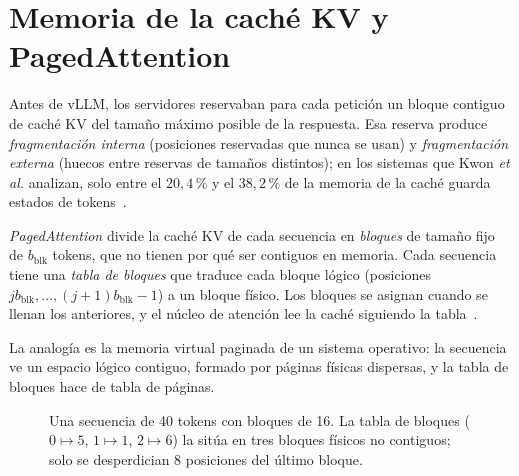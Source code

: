 \section{Memoria de la caché KV y PagedAttention}

Antes de vLLM, los servidores reservaban para cada petición un bloque contiguo de caché KV del tamaño máximo posible de la respuesta. Esa reserva produce \emph{fragmentación interna} (posiciones reservadas que nunca se usan) y \emph{fragmentación externa} (huecos entre reservas de tamaños distintos); en los sistemas que Kwon \emph{et al.} analizan, solo entre el $20{,}4\,\%$ y el $38{,}2\,\%$ de la memoria de la caché guarda estados de tokens~\cite[§1 y §3.1]{kwon}.

\begin{definicion}[PagedAttention]\label{def:paged}
\emph{PagedAttention} divide la caché KV de cada secuencia en \emph{bloques} de tamaño fijo de $b_{\mathrm{blk}}$ tokens, que no tienen por qué ser contiguos en memoria. Cada secuencia tiene una \emph{tabla de bloques} que traduce cada bloque lógico (posiciones $jb_{\mathrm{blk}},\dots,(j+1)b_{\mathrm{blk}}-1$) a un bloque físico. Los bloques se asignan cuando se llenan los anteriores, y el núcleo de atención lee la caché siguiendo la tabla~\cite[§4.1 y §4.2]{kwon}.
\end{definicion}

La analogía es la memoria virtual paginada de un sistema operativo: la secuencia ve un espacio lógico contiguo, formado por páginas físicas dispersas, y la tabla de bloques hace de tabla de páginas.

\begin{figure}[h]
\centering
{}
\caption{Una secuencia de 40 tokens con bloques de 16. La tabla de bloques ($0\mapsto 5$, $1\mapsto 1$, $2\mapsto 6$) la sitúa en tres bloques físicos no contiguos; solo se desperdician 8 posiciones del último bloque.}
\label{fig:paged}
\end{figure}

